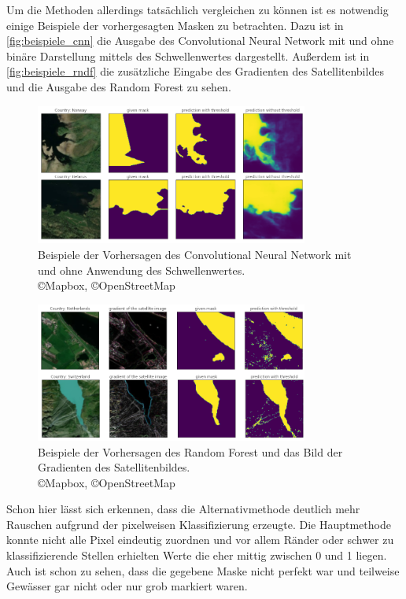Um die Methoden allerdings tatsächlich vergleichen zu können ist es notwendig einige Beispiele der vorhergesagten Masken zu betrachten.
Dazu ist in \autoref{fig:beispiele_cnn} die Ausgabe des Convolutional Neural Network mit und ohne binäre Darstellung mittels des Schwellenwertes dargestellt.
Außerdem ist in \autoref{fig:beispiele_rndf} die zusätzliche Eingabe des Gradienten des Satellitenbildes und die Ausgabe des Random Forest zu sehen.

\begin{figure}
    \centering
    \includegraphics[width=0.8\textwidth]{images/bsp_cnn.png}
    \caption{Beispiele der Vorhersagen des Convolutional Neural Network mit und ohne Anwendung des Schwellenwertes. %
    \\ \copyright Mapbox, \copyright OpenStreetMap}
    \label{fig:beispiele_cnn}
\end{figure}

\begin{figure}
    \centering
    \includegraphics[width=0.8\textwidth]{images/bsp_rndf.png}
    \caption{Beispiele der Vorhersagen des Random Forest und  %
    das Bild der Gradienten des Satellitenbildes. %
    \\ \copyright Mapbox, \copyright OpenStreetMap}
    \label{fig:beispiele_rndf}
\end{figure}

Schon hier lässt sich erkennen, dass die Alternativmethode deutlich mehr Rauschen aufgrund der pixelweisen Klassifizierung erzeugte.
Die Hauptmethode konnte nicht alle Pixel eindeutig zuordnen und vor allem Ränder oder schwer zu klassifizierende Stellen erhielten Werte die eher mittig zwischen 0 und 1 liegen.
Auch ist schon zu sehen, dass die gegebene Maske nicht perfekt war und teilweise Gewässer gar nicht oder nur grob markiert waren.

